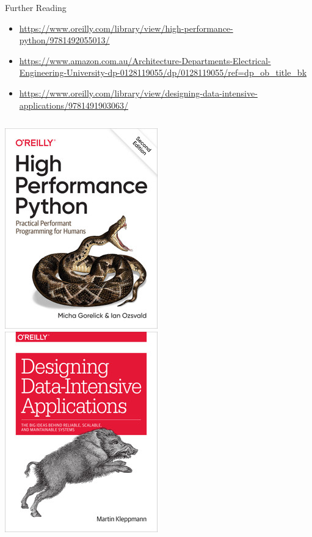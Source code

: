 \documentclass[12pt, aspectration=169]{beamer}
\begin{document}
    \begin{frame}{Further Reading}
        \begin{itemize}
            \item \url{https://www.oreilly.com/library/view/high-performance-python/9781492055013/}
            \item \url{https://www.amazon.com.au/Architecture-Departments-Electrical-Engineering-University-dp-0128119055/dp/0128119055/ref=dp_ob_title_bk}
            \item \url{https://www.oreilly.com/library/view/designing-data-intensive-applications/9781491903063/}
        \end{itemize}
        \begin{center}
            \begin{columns}
                \includegraphics[scale=0.35]{static/images/HighPerformancePython2ndEdition}
                \includegraphics[scale=0.35]{static/images/designing_data_intensive_applications}

\end{columns}
\end{center}
\end{frame}
\end{document}
